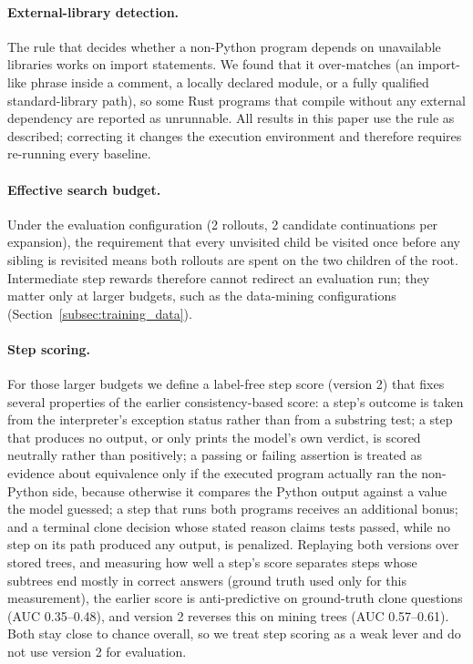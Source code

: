 \paragraph{External-library detection.} The rule that decides whether a
non-Python program depends on unavailable libraries works on import
statements. We found that it over-matches (an import-like phrase inside a
comment, a locally declared module, or a fully qualified standard-library
path), so some Rust programs that compile without any external dependency
are reported as unrunnable. All results in this paper use the rule as
described; correcting it changes the execution environment and therefore
requires re-running every baseline.


\paragraph{Effective search budget.} Under the evaluation configuration
(2 rollouts, 2 candidate continuations per expansion), the requirement that
every unvisited child be visited once before any sibling is revisited means
both rollouts are spent on the two children of the root. Intermediate step
rewards therefore cannot redirect an evaluation run; they matter only at
larger budgets, such as the data-mining configurations
(Section~\ref{subsec:training_data}).

\paragraph{Step scoring.} For those larger budgets we define a label-free
step score (version 2) that fixes several properties of the earlier
consistency-based score: a step's outcome is taken from the interpreter's
exception status rather than from a substring test; a step that produces no
output, or only prints the model's own verdict, is scored neutrally rather
than positively; a passing or failing assertion is treated as evidence about
equivalence only if the executed program actually ran the non-Python side,
because otherwise it compares the Python output against a value the model
guessed; a step that runs both programs receives an additional bonus; and a
terminal clone decision whose stated reason claims tests passed, while no
step on its path produced any output, is penalized. Replaying both versions
over stored trees, and measuring how well a step's score separates steps
whose subtrees end mostly in correct answers (ground truth used only for
this measurement), the earlier score is anti-predictive on ground-truth
clone questions (AUC 0.35--0.48), and version 2 reverses this on mining
trees (AUC 0.57--0.61). Both stay close to chance overall, so we treat step
scoring as a weak lever and do not use version 2 for evaluation.


